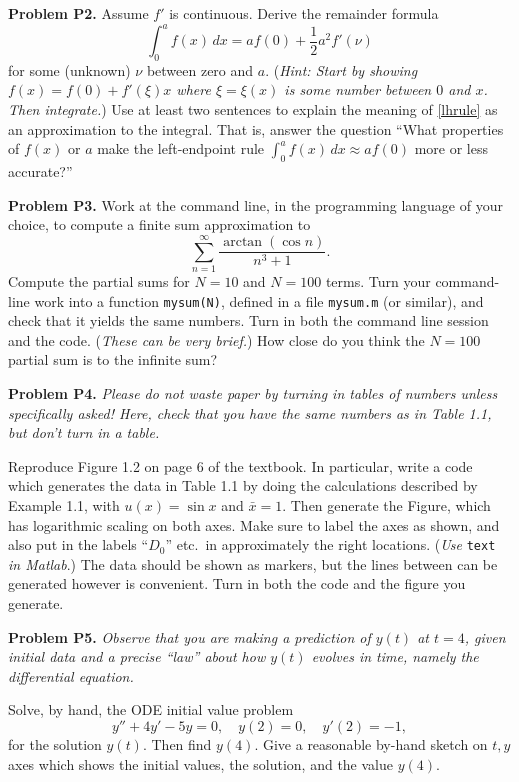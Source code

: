\documentclass[12pt]{amsart}
\newcommand{\prob}[1]{\bigskip\noindent\textbf{#1}\quad }
\begin{document}
\prob{Problem P2.}  Assume $f'$ is continuous.  Derive the remainder formula
\begin{equation}\label{lhrule}
\int_0^a f(x)\,dx = a f(0) + \frac{1}{2} a^2 f'(\nu)
\end{equation}
for some (unknown) $\nu$ between zero and $a$.  (\emph{Hint:  Start by showing $f(x)=f(0)+f'(\xi)x$ where $\xi=\xi(x)$ is some number between $0$ and $x$.  Then integrate.})  Use at least two sentences to explain the meaning of \eqref{lhrule} as an approximation to the integral.  That is, answer the question ``What properties of $f(x)$ or $a$ make the left-endpoint rule $\int_0^a f(x)\,dx \approx a f(0)$ more or less accurate?''

\prob{Problem P3.}  Work at the command line, in the programming language of your choice, to compute a finite sum approximation to
	$$\sum_{n=1}^\infty \frac{\arctan(\cos n)}{n^3+1}.$$
Compute the partial sums for $N=10$ and $N=100$ terms.  Turn your command-line work into a function \texttt{mysum(N)}, defined in a file \texttt{mysum.m} (or similar), and check that it yields the same numbers.  Turn in both the command line session and the code.  (\emph{These can be very brief.})  How close do you think the $N=100$ partial sum is to the infinite sum?

\prob{Problem P4.}  \emph{Please do \emph{not} waste paper by turning in tables of numbers unless specifically asked!  Here, check that you have the same numbers as in Table 1.1, but don't turn in a table.}

\medskip
\noindent Reproduce Figure 1.2 on page 6 of the textbook.  In particular, write a code which generates the data in Table 1.1 by doing the calculations described by Example 1.1, with $u(x)=\sin x$ and $\bar x = 1$.  Then generate the Figure, which has logarithmic scaling on both axes.  Make sure to label the axes as shown, and also put in the labels ``$D_0$'' etc.~in approximately the right locations.  (\emph{Use} \texttt{text} \emph{in Matlab}.)  The data should be shown as markers, but the lines between can be generated however is convenient.  Turn in both the code and the figure you generate.


\prob{Problem P5.}  \emph{Observe that you are making a \emph{prediction} of $y(t)$ at $t=4$, given initial data and a precise ``law'' about how $y(t)$ evolves in time, namely the differential equation.}

\medskip
\noindent Solve, by hand, the ODE initial value problem
\begin{equation}\label{ODE}
y'' + 4 y' - 5 y = 0, \quad y(2)=0, \quad y'(2)=-1,
\end{equation}
for the solution $y(t)$.  Then find $y(4)$.  Give a reasonable by-hand sketch on $t,y$ axes which shows the initial values, the solution, and the value $y(4)$.
\end{document}
